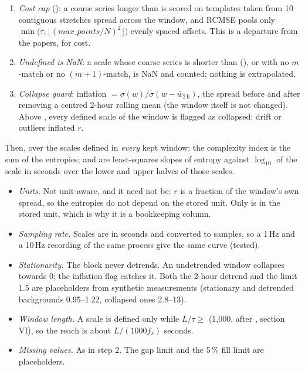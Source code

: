 \begin{enumerate}
  the counts of the series at offsets $k = 0,\dots,\tau-1$ are pooled,
  $\mathrm{RCMSE} = -\ln\bigl(\sum_k A_k / \sum_k B_k\bigr)$. This form is taken from the
  restatement in \citet{azami2017refined};  (the paper's full text was not reached; see
  , section 1).
\item \emph{Cost cap} (): a coarse series longer than  is
  scored on  templates taken from 10 contiguous stretches spread across the
  window, and RCMSE pools only $\min\bigl(\tau, \lfloor(\mathit{max\_points}/N)^2\rfloor\bigr)$
  evenly spaced offsets. This is a departure from the papers, for cost.
\item \emph{Undefined is NaN}: a scale whose coarse series is shorter than
   (), or with no $m$-match or no $(m+1)$-match, is NaN
  and counted; nothing is extrapolated.
\item \emph{Collapse guard}: inflation $= \sigma(w) / \sigma(w - \bar w_{2\,\mathrm h})$, the
  spread before and after removing a centred 2-hour rolling mean (the window itself is not
  changed). Above , every defined scale of the window is flagged as
  collapsed: drift or outliers inflated $r$.
\end{enumerate}
Then, over the scales defined in \emph{every} kept window: the complexity index
 is the sum of the entropies;  and 
are least-squares slopes of entropy against $\log_{10}$ of the scale in seconds over the
lower and upper halves of those scales.

\begin{itemize}
\item \emph{Units.} Not unit-aware, and it need not be: $r$ is a fraction of the window's
  own spread, so the entropies do not depend on the stored unit. Only  is in the
  stored unit, which is why it is a bookkeeping column.
\item \emph{Sampling rate.} Scales are in seconds and converted to samples, so a 1\,Hz and a
  10\,Hz recording of the same process give the same curve (tested).
\item \emph{Stationarity.} The block never detrends. An undetrended window collapses towards
  0; the inflation flag catches it. Both the 2-hour detrend and the limit 1.5 are
  placeholders from synthetic measurements (stationary and detrended backgrounds 0.95--1.22,
  collapsed ones 2.8--13).
\item \emph{Window length.} A scale is defined only while $L/\tau \ge$
   (1{,}000, after \citealt{costa2005multiscale}, section VI), so the
  reach is about $L / (1000 f_s)$ seconds.
\item \emph{Missing values.} As in step 2. The gap limit and the 5\,\% fill limit are
  placeholders.
\end{itemize}

